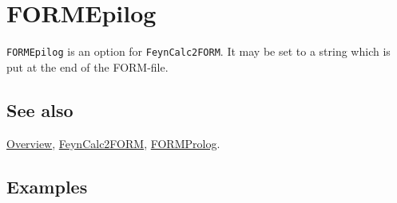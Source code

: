\documentclass[../FeynCalcManual.tex]{subfiles}
\begin{document}
\hypertarget{formepilog}{%
\section{FORMEpilog}\label{formepilog}}

\texttt{FORMEpilog} is an option for \texttt{FeynCalc2FORM}. It may be
set to a string which is put at the end of the FORM-file.

\subsection{See also}

\hyperlink{toc}{Overview}, \hyperlink{feyncalc2form}{FeynCalc2FORM},
\hyperlink{formprolog}{FORMProlog}.

\subsection{Examples}
\end{document}
